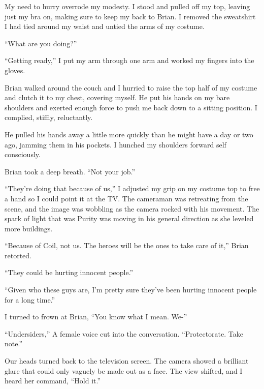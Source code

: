 My need to hurry overrode my modesty.  I stood and pulled off my top, leaving just my bra on, making sure to keep my back to Brian.   I removed the sweatshirt I had tied around my waist and untied the arms of my costume.



``What are you doing?''



``Getting ready,'' I put my arm through one arm and worked my fingers into the gloves.



Brian walked around the couch and I hurried to raise the top half of my costume and clutch it to my chest, covering myself.  He put his hands on my bare shoulders and exerted enough force to push me back down to a sitting position.  I complied, stiffly, reluctantly.



He pulled his hands away a little more quickly than he might have a day or two ago, jamming them in his pockets.  I hunched my shoulders forward self consciously.



Brian took a deep breath.  ``Not your job.''



``They're doing that because of us,'' I adjusted my grip on my costume top to free a hand so I could point it at the TV.  The cameraman was retreating from the scene, and the image was wobbling as the camera rocked with his movement.  The spark of light that was Purity was moving in his general direction as she leveled more buildings.



``Because of Coil, not us.  The heroes will be the ones to take care of it,'' Brian retorted.



``They could be hurting innocent people.''



``Given who these guys are, I'm pretty sure they've been hurting innocent people for a long time.''



I turned to frown at Brian, ``You know what I mean.  We-''



``Undersiders,'' A female voice cut into the conversation.  ``Protectorate.   Take note.''



Our heads turned back to the television screen.  The camera showed a brilliant glare that could only vaguely be made out as a face.  The view shifted, and I heard her command, ``Hold it.''



